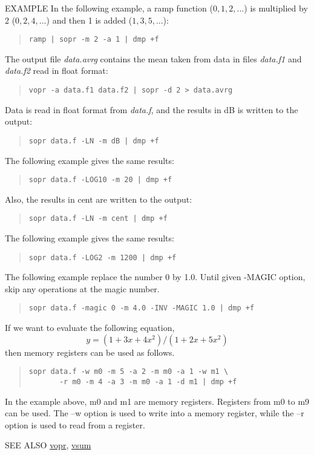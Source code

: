 \begin{qsection}{EXAMPLE}
In the following example, a ramp function ($0,1,2,\ldots$)
is multiplied by 2 ($0,2,4,\ldots$)
and then 1 is added ($1,3,5,\ldots$):
\begin{quote}
  \verb!ramp | sopr -m 2 -a 1 | dmp +f!
\end{quote}
\par
The output file {\em data.avrg} contains the mean taken from
data in files {\em data.f1} and {\em data.f2} read in float format:
\begin{quote}
  \verb!vopr -a data.f1 data.f2 | sopr -d 2 > data.avrg!
\end{quote}
\par
Data is read in float format from {\em data.f},
and the results in dB is written to the output:
\begin{quote}
  \verb!sopr data.f -LN -m dB | dmp +f!
\end{quote}
The following example gives the same results:
\begin{quote}
  \verb!sopr data.f -LOG10 -m 20 | dmp +f!
\end{quote}
\par
Also, the results in cent are written to the output:
\begin{quote}
  \verb!sopr data.f -LN -m cent | dmp +f!
\end{quote}
The following example gives the same results:
\begin{quote}
  \verb!sopr data.f -LOG2 -m 1200 | dmp +f!
\end{quote}
\par
The following example replace the number 0 by 1.0. Until
given -MAGIC option, skip any operations at the magic number.
\begin{quote}
  \verb!sopr data.f -magic 0 -m 4.0 -INV -MAGIC 1.0 | dmp +f!
\end{quote}
\par
If we want to evaluate the following equation,
\[
y = (1 + 3x + 4x^2) / (1 + 2x + 5x^2) 
\]
then memory registers can be used as follows.
\begin{quote}
\verb!sopr data.f -w m0 -m 5 -a 2 -m m0 -a 1 -w m1 \!\\
\verb!       -r m0 -m 4 -a 3 -m m0 -a 1 -d m1 | dmp +f!
\end{quote}
In the example above, m0 and m1 are memory registers.
Registers from m0 to m9 can be used.
The --w option is used to write into a memory register,
while the --r option is used to read from a register.
\end{qsection}

\begin{qsection}{SEE ALSO}
\hyperlink{vopr}{vopr},
\hyperlink{vsum}{vsum}
\end{qsection}
